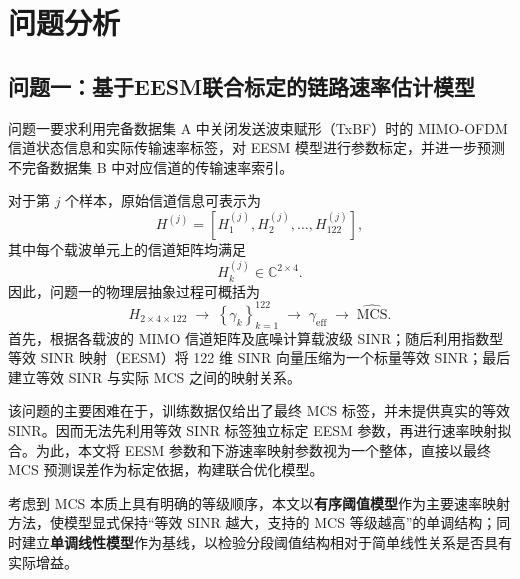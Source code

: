 \documentclass[bwprint]{gmcmthesis}
\numberwithin{figure}{section}
\begin{document}
\section{问题分析}

\subsection{问题一：基于EESM联合标定的链路速率估计模型}

问题一要求利用完备数据集 A 中关闭发送波束赋形（TxBF）时的 MIMO-OFDM 信道状态信息和实际传输速率标签，对 EESM 模型进行参数标定，并进一步预测不完备数据集 B 中对应信道的传输速率索引。

对于第 $j$ 个样本，原始信道信息可表示为
\begin{equation}
	H^{(j)}=\left[H_1^{(j)},H_2^{(j)},\ldots,H_{122}^{(j)}\right],
\end{equation}
其中每个载波单元上的信道矩阵均满足
\begin{equation}
	H_k^{(j)}\in\mathbb{C}^{2\times4}.
\end{equation}
因此，问题一的物理层抽象过程可概括为
\begin{equation}
	\boxed{
	H_{2\times4\times122}
	\;\longrightarrow\;
	\left\{\gamma_k\right\}_{k=1}^{122}
	\;\longrightarrow\;
	\gamma_{\mathrm{eff}}
	\;\longrightarrow\;
	\widehat{\mathrm{MCS}}
	}.
	\label{eq:chain}
\end{equation}
首先，根据各载波的 MIMO 信道矩阵及底噪计算载波级 SINR；随后利用指数型等效 SINR 映射（EESM）将 122 维 SINR 向量压缩为一个标量等效 SINR；最后建立等效 SINR 与实际 MCS 之间的映射关系。

该问题的主要困难在于，训练数据仅给出了最终 MCS 标签，并未提供真实的等效 SINR。因而无法先利用等效 SINR 标签独立标定 EESM 参数，再进行速率映射拟合。为此，本文将 EESM 参数和下游速率映射参数视为一个整体，直接以最终 MCS 预测误差作为标定依据，构建联合优化模型。

考虑到 MCS 本质上具有明确的等级顺序，本文以\textbf{有序阈值模型}作为主要速率映射方法，使模型显式保持``等效 SINR 越大，支持的 MCS 等级越高''的单调结构；同时建立\textbf{单调线性模型}作为基线，以检验分段阈值结构相对于简单线性关系是否具有实际增益。
\end{document}
